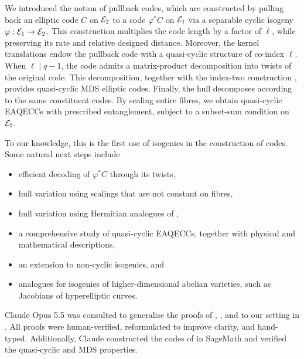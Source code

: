 \documentclass[twocolumn, 11pt]{scrartcl}
\begin{document}
We introduced the notion of pullback codes, which are constructed by pulling back an elliptic code $C$ on $\mathcal{E}_2$ to a code $\varphi^*C$ on $\mathcal{E}_1$ via a separable cyclic isogeny $\varphi:\mathcal{E}_1\to \mathcal{E}_2$. This construction multiplies the code length by a factor of $\ell$, while preserving its rate and relative designed distance. Moreover, the kernel translations endow the pullback code with a quasi-cyclic structure of co-index $\ell$. When $\ell\mid q-1$, the code admits a matrix-product decomposition into twists of the original code. This decomposition, together with the index-two construction \cite{wang2025nonrs}, provides quasi-cyclic MDS elliptic codes. Finally, the hull decomposes according to the same constituent codes. By scaling entire fibres, we obtain quasi-cyclic EAQECCs with prescribed entanglement, subject to a subset-sum condition on $\mathcal{E}_2$.

To our knowledge, this is the first use of isogenies in the construction of codes. Some natural next steps include
\begin{itemize}
    \item efficient decoding of $\varphi^*C$ through its twists,
    \item hull variation using scalings that are not constant on fibres,
    \item hull variation using Hermitian analogues of ,
    \item a comprehensive study of quasi-cyclic EAQECCs, together with physical and mathematical descriptions,
    \item an extension to non-cyclic isogenies, and
    \item analogues for isogenies of higher-dimensional abelian varieties, such as Jacobians of hyperelliptic curves.
\end{itemize}

\printbibliography


Claude Opus 5.5 was consulted to generalise the proofs of \cite[Prop.~4.1, Thm.~4.2]{ling2001algebraic}, \cite[Lem.~3--4]{wang2026generic}, and \cite[Thm.~1(i)]{fang2020euclidean} to our setting in . All proofs were human-verified, reformulated to improve clarity, and hand-typed. Additionally, Claude constructed the codes of  in SageMath \cite{code-f256,code-f64} and verified the quasi-cyclic and MDS properties.
\end{document}
